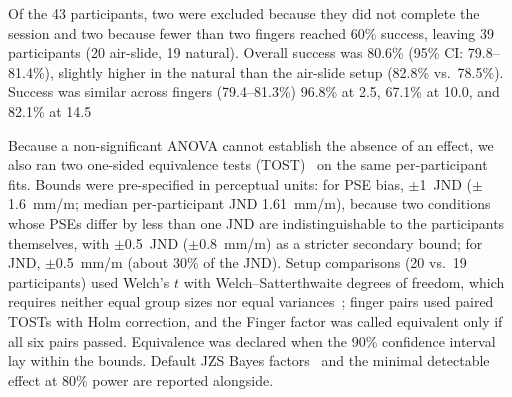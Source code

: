Of the 43 participants, two were excluded because they did not complete the session and two because fewer than two fingers reached 60\% success, leaving 39 participants (20 air-slide, 19 natural).
Overall success was 80.6\% (95\% CI: 79.8--81.4\%), slightly higher in the natural than the air-slide setup (82.8\% vs.\ 78.5\%). Success was similar across fingers (79.4--81.3\%)
96.8\% at 2.5, 67.1\% at 10.0, and 82.1\% at 14.5

Because a non-significant ANOVA cannot establish the absence of an effect, we also ran two one-sided equivalence tests (TOST)~\cite{lakens2017} on the same per-participant fits. Bounds were pre-specified in perceptual units: for PSE bias, $\pm$1~JND ($\pm$1.6~mm/m; median per-participant JND 1.61~mm/m), because two conditions whose PSEs differ by less than one JND are indistinguishable to the participants themselves, with $\pm$0.5~JND ($\pm$0.8~mm/m) as a stricter secondary bound; for JND, $\pm$0.5~mm/m (about 30\% of the JND). Setup comparisons (20 vs.\ 19 participants) used Welch's $t$ with Welch--Satterthwaite degrees of freedom, which requires neither equal group sizes nor equal variances~\cite{delacre2017}; finger pairs used paired TOSTs with Holm correction, and the Finger factor was called equivalent only if all six pairs passed. Equivalence was declared when the 90\% confidence interval lay within the bounds. Default JZS Bayes factors~\cite{rouder2009} and the minimal detectable effect at 80\% power are reported alongside.

